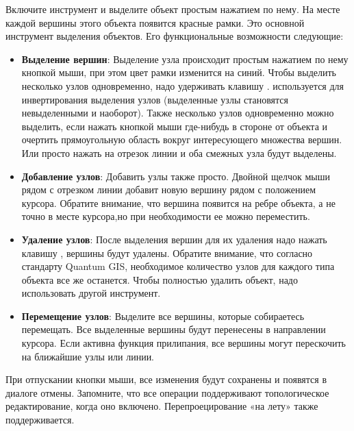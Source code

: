 
Включите инструмент  и выделите объект
простым нажатием по нему. На месте каждой вершины этого объекта появится
красные рамки. Это основной инструмент выделения объектов.
Его функциональные возможности следующие:

\begin{itemize}[label=--]
\item \textbf{Выделение вершин}: Выделение узла происходит простым нажатием
по нему кнопкой мыши, при этом цвет рамки изменится на синий. Чтобы выделить
несколько узлов одновременно, надо удерживать клавишу
.
 используется для инвертирования выделения узлов (выделенные
узлы становятся невыделенными и наоборот). Также несколько узлов одновременно
можно выделить, если нажать кнопкой мыши где-нибудь в стороне от объекта и
очертить прямоугольную область вокруг интересующего множества вершин. Или
просто нажать на отрезок линии и оба смежных узла будут выделены.
\item \textbf{Добавление узлов}: Добавить узлы также просто. Двойной щелчок
мыши рядом с отрезком линии добавит новую вершину рядом с положением курсора.
Обратите внимание, что вершина появится на ребре объекта, а не точно в
месте курсора,но при необходимости ее можно переместить.
\item \textbf{Удаление узлов}: После выделения вершин для их удаления надо
нажать клавишу , вершины будут удалены. Обратите внимание,
что согласно стандарту Quantum GIS, необходимое количество узлов для каждого
типа объекта все же останется. Чтобы полностью удалить объект, надо использовать
другой инструмент.
\item \textbf{Перемещение узлов}: Выделите все вершины, которые собираетесь
перемещать. Все выделенные вершины будут перенесены в направлении курсора.
Если активна функция прилипания, все вершины могут перескочить на
ближайшие узлы или линии.
\end{itemize}

При отпускании кнопки мыши, все изменения будут сохранены и появятся в
диалоге отмены. Запомните, что все операции поддерживают топологическое
редактирование, когда оно включено. Перепроецирование «на лету» также
поддерживается.


